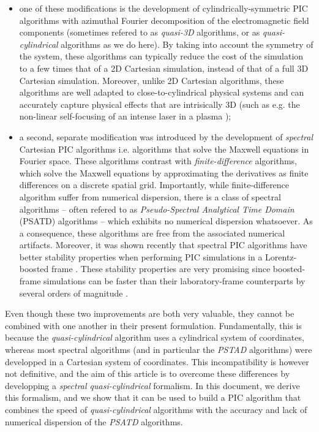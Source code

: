 \documentclass[1p,times,authoryear]{elsarticle}
\begin{document}
\begin{itemize}
\item one of these modifications is the development of cylindrically-symmetric
PIC algorithms with azimuthal Fourier decomposition \citep{godfrey1985iprop,Lifschitz,Davidson} 
of the electromagnetic field components 
(sometimes refered to as \emph{quasi-3D} algorithms, or as
\emph{quasi-cylindrical} algorithms as we do here). By taking
into account the symmetry of the system, these algorithms can typically reduce
the cost of the simulation to a few times that of a 2D Cartesian simulation,
instead of that of a full 3D Cartesian simulation. Moreover, unlike 2D
Cartesian algorithms, these algorithms are well adapted to close-to-cylindrical
physical systems and can accurately capture physical effects that are intrisically
3D (such as e.g. the non-linear self-focusing of an intense laser in a
plasma \citep{EsareyRMP2009});

\item a second, separate modification was introduced by the development
  of \emph{spectral} Cartesian PIC algorithms
  \citep{Haber,BunemanJCP1980,DawsonRMP1983} i.e. algorithms that solve the
  Maxwell equations in Fourier space. These algorithms contrast with
  \emph{finite-difference} algorithms, which solve the Maxwell equations
  by approximating the derivatives as finite differences on a discrete spatial grid.
Importantly, while finite-difference algorithm suffer from
numerical dispersion, there is a class of spectral algorithms -- often refered to
as \emph{Pseudo-Spectral Analytical Time Domain} (PSATD) algorithms 
\citep{Haber,BunemanJCP1980} -- which exhibits no numerical dispersion whatsoever. As a
consequence, these algorithms are free from the associated numerical
artifacts. Moreover, it was shown recently
\citep{GodfreyJCP2014,GodfreyIEEE2014,YuJCP2014,YuCPC2015} 
that spectral PIC algorithms have better stability properties when 
performing PIC simulations in
a Lorentz-boosted frame \citep{VayPRL2007,MartinsNatPhys2010,VayJCP2011}. 
These stability properties are very
promising since boosted-frame simulations can be faster than 
their laboratory-frame counterparts by several orders of magnitude \citep{VayPRL2007}.
\end{itemize}

Even though these two improvements are both very valuable, they cannot be
combined with one another in their present
formulation. Fundamentally, this is because the \emph{quasi-cylindrical} algorithm uses a
cylindrical system of coordinates, whereas most spectral algorithms
(and in particular the \emph{PSTAD} algorithms)
were developped in a Cartesian system of coordinates. This
incompatibility is however not definitive, and the aim of this article
is to overcome these differences by developping a \emph{spectral
  quasi-cylindrical} formalism. In this document, we derive this formalism,
and we show that it can be used to build a PIC algorithm that combines 
the speed of \emph{quasi-cylindrical} algorithms with
the accuracy and lack of numerical dispersion of the \emph{PSATD} algorithms.
\end{document}
